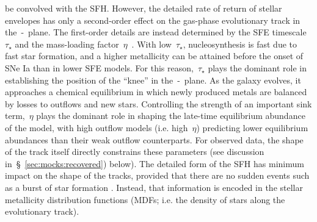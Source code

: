 \documentclass[ms.tex]{subfiles}
\begin{document}
be convolved with the SFH.
However, the detailed rate of return of stellar envelopes has only a
second-order effect on the gas-phase evolutionary track in the~\afe-\feh~plane.
The first-order details are instead determined by the SFE timescale~$\tau_\star$
and the mass-loading factor~$\eta$~\citep{Weinberg2017}.
With low~$\tau_\star$, nucleosynthesis is fast due to fast star formation, and
a higher metallicity can be attained before the onset of SNe Ia than in lower
SFE models.
For this reason,~$\tau_\star$ plays the dominant role in establishing the
position of the ``knee'' in the~\afe-\feh~plane.
As the galaxy evolves, it approaches a chemical equilibrium in which newly
produced metals are balanced by losses to outflows and new stars.
Controlling the strength of an important sink term,~$\eta$ plays the dominant
role in shaping the late-time equilibrium abundance of the model, with high
outflow models (i.e. high~$\eta$) predicting lower equilibrium abundances
than their weak outflow counterparts.
For observed data, the shape of the track itself directly constrains these
parameters (see discussion in~\S~\ref{sec:mocks:recovered}) below).
The detailed form of the SFH has minimum impact on the shape of the tracks,
provided that there are no sudden events such as a burst of star formation
\citep{Weinberg2017, Johnson2020}.
Instead, that information is encoded in the stellar metallicity distribution
functions (MDFs; i.e. the density of stars along the evolutionary track).
\end{document}
